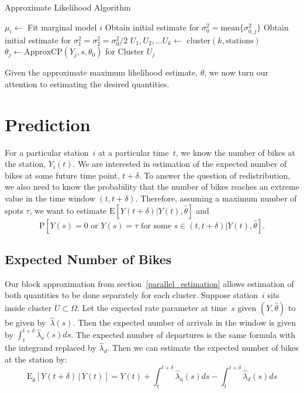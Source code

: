 \documentclass{acm_proc_article-sp}
\begin{document}
\begin{algorithm}[!h]
\caption{Approximate Likelihood Algorithm} \label{applik_alg}
\begin{algorithmic}
\STATE $\mu_i \gets$ Fit marginal model $i$ 
\ENDFOR
\STATE Obtain initial estimate for $\sigma_0^2 = \text{mean} \{ \sigma_{0,j}^2\}$
\STATE Obtain initial estimate for $\sigma_1^2 = \sigma_2^2 = \sigma_0^2 / 2$
\STATE $U_1, U_2, \ldots U_k \gets$ cluster$(k, \text{stations})$
\STATE $\theta_j \gets \text{ApproxCP} (Y_j, s, \theta_0)$ for Cluster $U_j$
\ENDFOR
\end{algorithmic}
\end{algorithm}

Given the approximate maximum likelihood estimate, $\theta$, we now turn our attention to estimating the desired quantities.

\section{Prediction}

For a particular station~$i$ at a particular time~$t$, we know the number of bikes at the station, $Y_i(t)$.  We are interested in estimation of the expected number of bikes at some future time point, $t+\delta$.  To answer the question of redistribution, we also need to know the probability that the number of bikes reaches an extreme value in the time window $(t, t+\delta)$.  Therefore, assuming a maximum number of spots $\tau$, we want to estimate $\text{E} \left[ Y(t+ \delta) | Y(t) , \hat{\theta} \right]$ and 
\begin{equation*}
\text{P} [ Y(s) = 0 \text{ or } Y(s) = \tau \text{ for some } s \in (t, t+\delta) | Y(t), \hat{\theta} ].  
\end{equation*}

\subsection{Expected Number of Bikes}
Our block approximation from section~\ref{parallel_estimation} allows estimation of both quantities to be done separately for each cluster.  Suppose station~$i$ sits inside cluster $U \subset \Omega$.  Let the expected rate parameter at time~$s$ given $(Y,\hat{\theta})$ to be given by~$\hat{\lambda} (s)$.  Then the expected number of arrivals in the window is given by $\int_{t}^{t+\delta} \hat{\lambda}_a (s) ds$.  The expected number of departures is the same formula with the integrand replaced by $\hat{\lambda}_d$.  Then we can estimate the expected number of bikes at the station by:
\begin{equation*}
\text{E}_{\hat{\theta}} \left[ Y(t+ \delta) \, | \, Y(t) \right] = Y(t) + \int_{t}^{t+\delta} \hat{\lambda}_a (s) ds - \int_{t}^{t+\delta} \hat{\lambda}_d (s) ds
\end{equation*}
\end{document}

